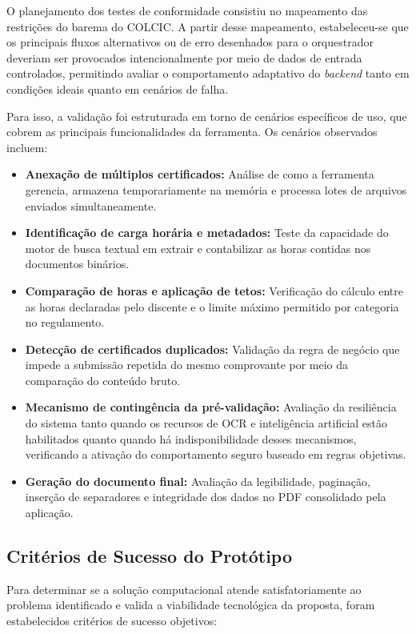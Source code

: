 O planejamento dos testes de conformidade consistiu no mapeamento das restrições do barema do COLCIC. A partir desse mapeamento, estabeleceu-se que os principais fluxos alternativos ou de erro desenhados para o orquestrador deveriam ser provocados intencionalmente por meio de dados de entrada controlados, permitindo avaliar o comportamento adaptativo do \textit{backend} tanto em condições ideais quanto em cenários de falha.

Para isso, a validação foi estruturada em torno de cenários específicos de uso, que cobrem as principais funcionalidades da ferramenta. Os cenários observados incluem:


\begin{itemize}
    \item \textbf{Anexação de múltiplos certificados:} Análise de como a ferramenta gerencia, armazena temporariamente na memória e processa lotes de arquivos enviados simultaneamente.
    \item \textbf{Identificação de carga horária e metadados:} Teste da capacidade do motor de busca textual em extrair e contabilizar as horas contidas nos documentos binários.
    \item \textbf{Comparação de horas e aplicação de tetos:} Verificação do cálculo entre as horas declaradas pelo discente e o limite máximo permitido por categoria no regulamento.
    \item \textbf{Detecção de certificados duplicados:} Validação da regra de negócio que impede a submissão repetida do mesmo comprovante por meio da comparação do conteúdo bruto.
    \item \textbf{Mecanismo de contingência da pré-validação:} Avaliação da resiliência do sistema tanto quando os recursos de OCR e inteligência artificial estão habilitados quanto quando há indisponibilidade desses mecanismos, verificando a ativação do comportamento seguro baseado em regras objetivas.
    \item \textbf{Geração do documento final:} Avaliação da legibilidade, paginação, inserção de separadores e integridade dos dados no PDF consolidado pela aplicação.
\end{itemize}

\subsection{Critérios de Sucesso do Protótipo}\label{subsec:criterios_sucesso}

Para determinar se a solução computacional atende satisfatoriamente ao problema identificado e valida a viabilidade tecnológica da proposta, foram estabelecidos critérios de sucesso objetivos:

